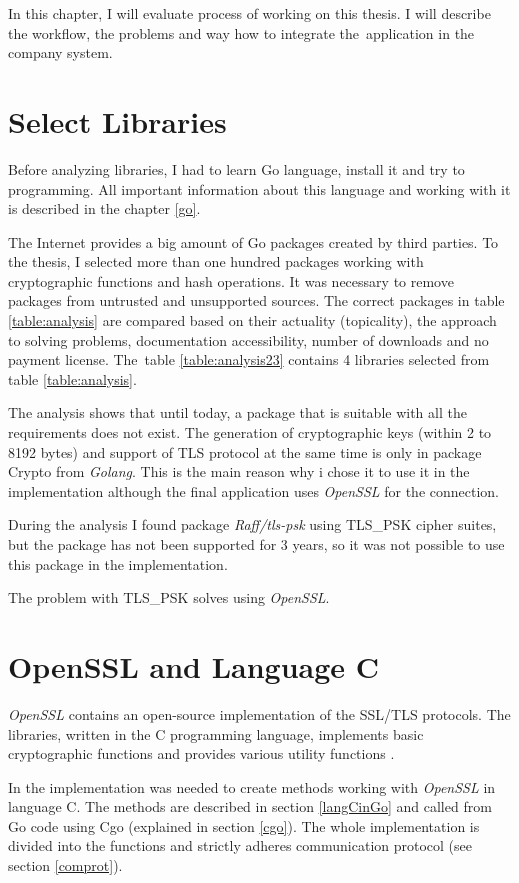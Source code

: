 \documentclass[
  twoside, 12pt, 
  printed, %
  notable,   %
  lof,     %
  lot,     %
]{fithesis3}
\begin{document}
In this chapter, I will evaluate process of working on this thesis. I will describe the workflow, 
the problems and way how to integrate the~application in the company system.

\section{Select Libraries}
Before analyzing libraries, I had to learn Go language, install it and try to programming. All 
important information about this language and working with it is described in the chapter 
\ref{go}. 

The Internet provides a big amount of Go packages created by third parties. To the thesis, I 
selected more than one hundred packages working with cryptographic functions and hash operations. 
It was necessary to remove packages from untrusted and unsupported sources. The correct packages 
in table \ref{table:analysis} are compared based on their actuality (topicality), the approach to 
solving problems, documentation accessibility, number of downloads and no payment license. The~table \ref{table:analysis23} contains 4 libraries selected from table \ref{table:analysis}. 

The analysis shows that until today, a package that is suitable with all the requirements does not 
exist. The generation of cryptographic keys (within 2 to 8192 bytes) and support of TLS protocol at 
the same time is only in package Crypto from \textit{Golang}. This is the main reason why i chose it to use it in the implementation although the final application uses \textit{OpenSSL} for the connection.

During the analysis I found package \textit{Raff/tls-psk} using TLS\_PSK cipher suites, but the 
package has not been supported for 3 years, so it was not possible to use this package in the 
implementation. 

The problem with TLS\_PSK solves using \textit{OpenSSL}.

\section{OpenSSL and Language C}

\textit{OpenSSL} contains an open-source implementation of the SSL/TLS protocols. The libraries, 
written in the C programming language, implements basic cryptographic functions and provides 
various utility functions \cite{foundation}. 

In the implementation was needed to create methods working with \textit{OpenSSL} in language C. 
The methods are described in section \ref{langCinGo} and called from Go code using Cgo (explained 
in section \ref{cgo}). The whole implementation is divided into the functions and strictly adheres 
communication protocol (see section \ref{comprot}). 
\end{document}
